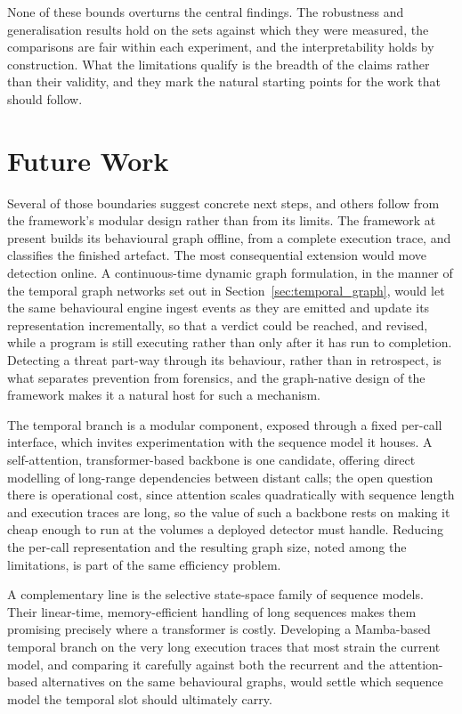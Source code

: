 \documentclass[%
    BCOR=10mm,
    DIV=13,
    toc=bibliography,
    toc=listof,
    oneside,
    12pt,
]{scrbook}
\begin{document}
None of these bounds overturns the central findings. The robustness and
generalisation results hold on the sets against which they were measured, the
comparisons are fair within each experiment, and the interpretability holds by
construction. What the limitations qualify is the breadth of the claims rather than
their validity, and they mark the natural starting points for the work that should
follow.

\section{Future Work}
\label{sec:future_work}

Several of those boundaries suggest concrete next steps, and others follow from the
framework's modular design rather than from its limits. The framework at present
builds its behavioural graph offline, from a complete execution trace, and
classifies the finished artefact. The most consequential extension would move
detection online. A continuous-time dynamic graph formulation, in the manner of the
temporal graph networks set out in Section~\ref{sec:temporal_graph}, would let the same behavioural engine ingest events as they
are emitted and update its representation incrementally, so that a verdict could be
reached, and revised, while a program is still executing rather than only after it
has run to completion. Detecting a threat part-way through its behaviour, rather than
in retrospect, is what separates prevention from forensics, and the graph-native
design of the framework makes it a natural host for such a mechanism.

The temporal branch is a modular component, exposed through a fixed per-call
interface, which invites experimentation with the sequence model it houses. A
self-attention, transformer-based backbone is one candidate, offering direct
modelling of long-range dependencies between distant calls; the open question there
is operational cost, since attention scales quadratically with sequence length and
execution traces are long, so the value of such a backbone rests on making it cheap
enough to run at the volumes a deployed detector must handle. Reducing the per-call
representation and the resulting graph size, noted among the limitations, is part of
the same efficiency problem.

A complementary line is the selective state-space family of sequence models.
Their linear-time, memory-efficient handling of long sequences makes them
promising precisely where a transformer is costly. Developing a Mamba-based
temporal branch on the very long execution traces that most strain the current
model, and comparing it carefully against both the recurrent and the
attention-based alternatives on the same behavioural graphs, would settle which
sequence model the temporal slot should ultimately carry.
\end{document}
